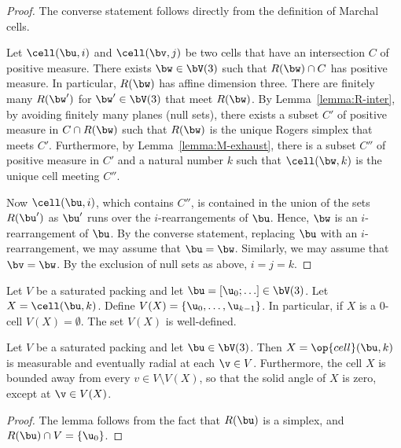 \begin{proof} 
The converse statement follows directly from the definition of Marchal cells.

Let $\cell(\bu,i)$ and $\cell(\bv,j)$ be two cells that have an
intersection $C$ of positive measure.  There exists $\bw\in \bV(3)$
such that $R(\bw)\cap C$ has positive measure.  In particular,
$R(\bw)$ has affine dimension three.  There are finitely many
$R(\bw')$ for $\bw'\in \bV(3)$ that meet $R(\bw)$.  By
Lemma~\ref{lemma:R-inter}, by avoiding finitely many planes (null
sets), there exists a subset $C'$ of positive measure in $C\cap
R(\bw)$ such that $R(\bw)$ is the unique Rogers simplex that meets
$C'$.  Furthermore, by Lemma~\ref{lemma:M-exhaust}, there is a subset
$C''$ of positive measure in $C'$ and a natural number $k$ such that
$\cell(\bw,k)$ is the unique cell meeting $C''$.

Now $\cell(\bu,i)$, which contains $C''$, is contained in the union of
the sets $R(\bu')$ as $\bu'$ runs over the $i$-rearrangements of
$\bu$.  Hence, $\bw$ is an $i$-rearrangement of $\bu$.  By the
converse statement, replacing $\bu$ with an $i$-rearrangement, we may
assume that $\bu=\bw$.  Similarly, we may assume that $\bv=\bw$.  By
the exclusion of null sets as above, $i=j=k$.
\end{proof}



\begin{definition}
  Let $V$ be a saturated packing and let $\bu=[\u_0;\ldots]\in
  \bV(3)$.  Let $X=\cell(\bu,k)$.  Define $V(X) =
  \{\u_0,\ldots,\u_{k-1}\}$.  In particular, if $X$ is a $0$-cell
  $V(X)=\emptyset$.  The set $V(X)$ is well-defined.
\end{definition}


\begin{lemma}\label{lemma:cell-radial}
  Let $V$ be a saturated packing and let $\bu\in \bV(3)$.  Then
  $X=\op{cell}(\bu,k)$ is measurable and eventually radial at each
  $\v\in V$.  Furthermore, the cell $X$ is bounded away from every
  $v\in V\setminus V(X)$, so that the solid angle of $X$ is zero, except
  at $\v\in V(X)$.
\end{lemma}

\begin{proof} The lemma follows from the fact that $R(\bu)$ is a
  simplex, and $R(\bu)\cap V = \{\u_0\}$.
\end{proof}




